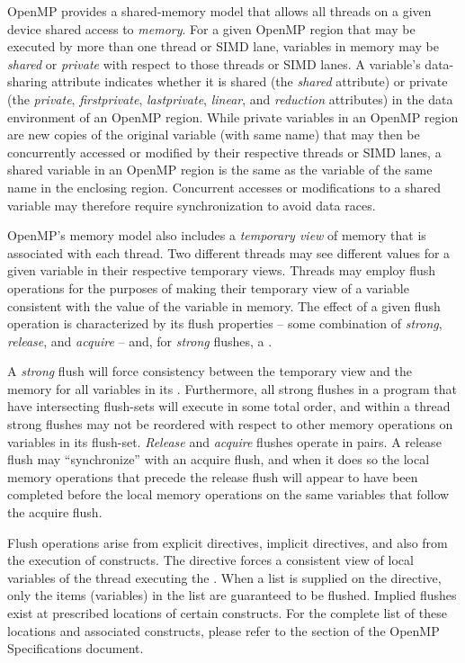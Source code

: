 \label{chap:memory_model}

OpenMP provides a shared-memory model that allows all threads on a given
device shared access to \emph{memory}. For a given OpenMP region that may be
executed by more than one thread or SIMD lane, variables in memory may be
\emph{shared} or \emph{private} with respect to those threads or SIMD lanes. A
variable's data-sharing attribute indicates whether it is shared (the
\emph{shared} attribute) or private (the \emph{private}, \emph{firstprivate},
\emph{lastprivate}, \emph{linear}, and \emph{reduction} attributes) in the data
environment of an OpenMP region. While private variables in an OpenMP region
are new copies of the original variable (with same name) that may then be
concurrently accessed or modified by their respective threads or SIMD lanes, a
shared variable in an OpenMP region is the same as the variable of the same
name in the enclosing region. Concurrent accesses or modifications to a
shared variable may therefore require synchronization to avoid data races.

OpenMP's memory model also includes a \emph{temporary view} of memory that is
associated with each thread. Two different threads may see different values for
a given variable in their respective temporary views. Threads may employ flush
operations for the purposes of making their temporary view of a variable
consistent with the value of the variable in memory. The effect of a given
flush operation is characterized by its flush properties -- some combination of
\emph{strong}, \emph{release}, and \emph{acquire} -- and, for \emph{strong}
flushes, a .

A \emph{strong} flush will force consistency between the temporary view and the
memory for all variables in its .  Furthermore, all strong flushes in a
program that have intersecting flush-sets will execute in some total order, and
within a thread strong flushes may not be reordered with respect to other
memory operations on variables in its flush-set. \emph{Release} and
\emph{acquire} flushes operate in pairs. A release flush may ``synchronize''
with an acquire flush, and when it does so the local memory operations that
precede the release flush will appear to have been completed before the local
memory operations on the same variables that follow the acquire flush.

Flush operations arise from explicit  directives, implicit
 directives, and also from the execution of 
constructs. The  directive forces a consistent view of local
variables of the thread executing the .  When a list is supplied on
the directive, only the items (variables) in the list are guaranteed to be
flushed.  Implied flushes exist at prescribed locations of certain constructs.
For the complete list of these locations and associated constructs, please
refer to the  section of the OpenMP Specifications
document.

